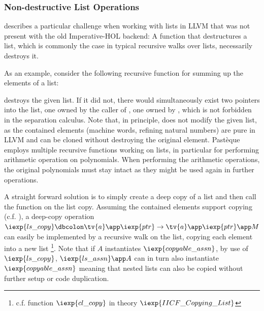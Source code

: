 \subsubsection{Non-destructive List Operations}

 describes a particular challenge when working with lists in LLVM that was not present with the old Imperative-HOL backend:
A function that destructures a list, which is commonly the case in typical recursive walks over lists, necessarily destroys it.

As an example, consider the following recursive function for summing up the elements of a list:

 destroys the given list.
If it did not, there would simultaneously exist two pointers into the list, one owned by the caller of , one owned by , which is not forbidden in the separation calculus.
Note that, in principle,  does not modify the given list, as the contained elements (machine words, refining natural numbers) are pure in LLVM and can be cloned without destroying the original element.
Pastèque employs multiple recursive functions working on lists, in particular for performing arithmetic operation on polynomials.
When performing the arithmetic operations, the original polynomials must stay intact as they might be used again in further operations.

A straight forward solution is to simply create a deep copy of a list and then call the function on the list copy.
Assuming the contained elements support copying (c.f. ), a deep-copy operation $\iexp{ls\_copy} \dbcolon \tv{a} \app \iexp{ptr} \rightarrow \tv{a} \app \iexp{ptr} \app M$ can easily be implemented by a recursive walk on the list, copying each element into a new list \footnote{c.f. function $\iexp{cl\_copy}$ in theory $\iexp{IICF\_Copying\_List}$}.
Note that if $A$ instantiates $\iexp{copyable\_assn}$, by use of $\iexp{ls\_copy}$, $\iexp{ls\_assn} \app A$ can in turn also instantiate $\iexp{copyable\_assn}$ meaning that nested lists can also be copied without further setup or code duplication.

